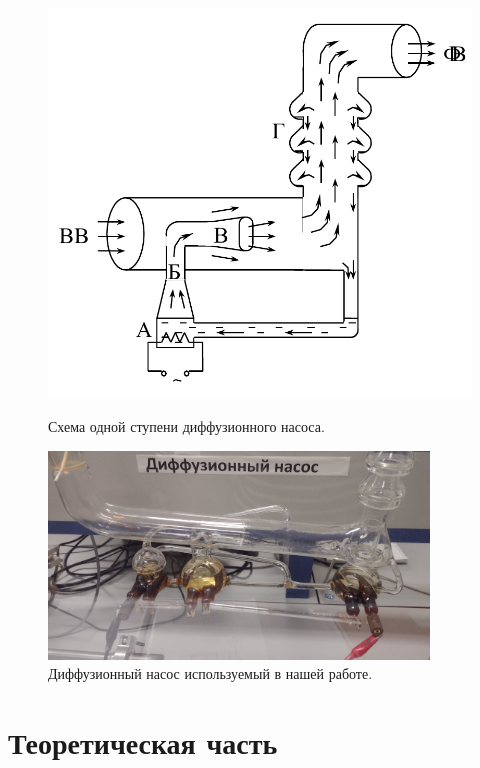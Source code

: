 \documentclass{article}
\begin{document}
    \begin{figure}[h]
    \centering
    \begin{minipage}{0.35\textwidth}
        \centering
        \includegraphics[width=1\textwidth]{diffuzionni_nasos}
        \caption{Схема одной ступени диффузионного насоса.}
        \label{ris:diffuzionni_nasos}
    \end{minipage}\hfill
    \begin{minipage}{0.65\textwidth}
        \centering
        \includegraphics[width=0.9\textwidth]{nasos_irl}
        \caption{Диффузионный насос используемый в нашей работе.}
        \label{ris:nasos_irl}
    \end{minipage}
    \end{figure}


    \section{Теоретическая часть}
\end{document}
